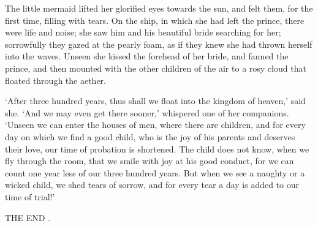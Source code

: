 The little mermaid lifted her glorified eyes towards the sun,
and felt them, for the first time, filling with tears. 
On the ship, in
which she had left the prince, there were life and noise; she saw
him and his beautiful bride searching for her; sorrowfully they
gazed at the pearly foam, as if they knew she had thrown herself
into the waves. 
Unseen she kissed the forehead of her bride, and
fanned the prince, and then mounted with the other children of the air
to a rosy cloud that floated through the aether.

`After three hundred years, thus shall we float into the kingdom
of heaven,' said she. 
`And we may even get there sooner,' whispered
one of her companions. 
`Unseen we can enter the houses of men, where
there are children, and for every day on which we find a good child,
who is the joy of his parents and deserves their love, our time of
probation is shortened. 
The child does not know, when we fly through
the room, that we smile with joy at his good conduct, for we can count
one year less of our three hundred years. 
But when we see a naughty or
a wicked child, we shed tears of sorrow, and for every tear a day is
added to our time of trial!'









THE END
.
